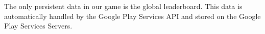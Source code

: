 The only persistent data in our game is the global leaderboard. This data is automatically handled by the Google Play Services API and stored on the Google Play Services Servers. 
